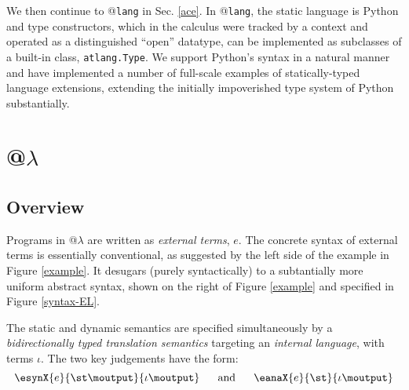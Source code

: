 We then continue to @\texttt{lang} in Sec. \ref{ace}. In @\texttt{lang}, the static language is Python and type constructors, which in the calculus were  tracked by a context and operated as a distinguished ``open'' datatype, can be implemented as subclasses of a built-in class, \verb|atlang.Type|. We support Python's syntax in a natural manner and have implemented a number of full-scale examples of statically-typed language extensions, extending the initially impoverished type system of Python substantially.%

\section{@$\lambda$}\label{atlam}
\subsection{Overview}
Programs in @$\lambda$ are written as \emph{external terms}, $e$. The concrete syntax of external terms is essentially conventional, as suggested by the left side of the example in Figure \ref{example}. It desugars (purely syntactically) to a subtantially more uniform abstract syntax, shown on the right of Figure \ref{example} and specified in Figure \ref{syntax-EL}.%

The static and dynamic semantics are specified simultaneously by a \emph{bidirectionally typed translation semantics} targeting an \emph{internal language}, with terms $\iota$. The two key judgements have the form:  \[\esynX{e}{\st\moutput}{\iota\moutput} ~~~~~\text{and}~~~~~ \eanaX{e}{\st}{\iota\moutput}\]
\noindent

